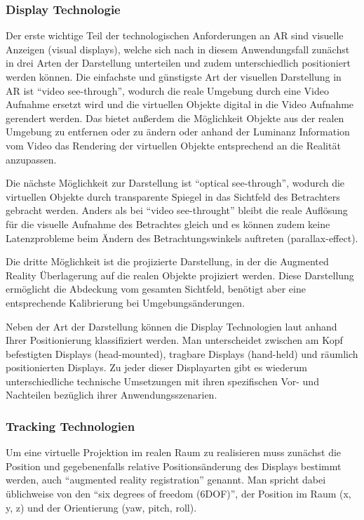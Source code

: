 \subsubsection{Display Technologie}

Der erste wichtige Teil der technologischen Anforderungen an AR sind visuelle Anzeigen (visual displays), welche sich nach \citet{van2010survey}
in diesem Anwendungsfall zunächst in drei Arten der Darstellung unterteilen und zudem unterschiedlich positioniert werden können. Die einfachste und günstigste Art der visuellen Darstellung in AR ist \enquote{video see-through}, wodurch die reale Umgebung durch eine Video Aufnahme ersetzt wird und die virtuellen Objekte digital in die Video Aufnahme gerendert werden. Das bietet außerdem die Möglichkeit Objekte aus der realen Umgebung zu entfernen oder zu ändern oder anhand der Luminanz Information vom Video das Rendering der virtuellen Objekte entsprechend an die Realität anzupassen.

Die nächste Möglichkeit zur Darstellung ist \enquote{optical see-through}, wodurch die virtuellen Objekte durch transparente Spiegel in das Sichtfeld des Betrachters gebracht werden. Anders als bei \enquote{video see-throught} bleibt die reale Auflösung für die visuelle Aufnahme des Betrachtes gleich und es können zudem keine Latenzprobleme beim Ändern des Betrachtungswinkels auftreten (parallax-effect).

Die dritte Möglichkeit ist die projizierte Darstellung, in der die Augmented Reality Überlagerung auf die realen Objekte projiziert werden. Diese Darstellung ermöglicht die Abdeckung vom gesamten Sichtfeld, benötigt aber eine entsprechende Kalibrierung bei Umgebungsänderungen.

Neben der Art der Darstellung können die Display Technologien laut \citet{azuma2001recent} anhand Ihrer Positionierung klassifiziert werden. Man unterscheidet zwischen am Kopf befestigten Displays (head-mounted), tragbare Displays (hand-held) und räumlich positionierten Displays. Zu jeder dieser Displayarten gibt es wiederum unterschiedliche technische Umsetzungen mit ihren spezifischen Vor- und Nachteilen bezüglich ihrer Anwendungsszenarien.

\subsubsection{Tracking Technologien}

Um eine virtuelle Projektion im realen Raum zu realisieren muss zunächst die Position und gegebenenfalls relative Positionsänderung des Displays bestimmt werden, auch \enquote{augmented reality registration} genannt. Man spricht dabei üblichweise von den \enquote{six degrees of freedom (6DOF)}, der Position im Raum (x, y, z) und der Orientierung (yaw, pitch, roll). 


